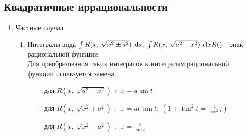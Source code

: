 \documentclass[a4paper,12pt]{bookest}
\theoremstyle{remark}
\newcommand\dx{\textbf{ d}x}
\begin{document}
\subsection{Квадратичные иррациональности}
\begin{enumerate}
	\item Частные случаи \begin{enumerate} 
	\item Интегралы вида $\int R(x,\>\sqrt{x^2\pm a^2})\dx,\>\int R(x,\>\sqrt{a^2-x^2})\dx\\ R()$ - знак рациональной функции. \\
		Для преобразования таких интегралов к интегралам рациональной функции испльзуется замена.\begin{itemize}
			\item [-] для $R(x,\>\sqrt{a^2-x^2})\>\>:\>\>x=a\sin t$ 
			\item [-] для $R(x,\>\sqrt{x^2+ a^2})\>\>:\>\>x=at\tan t;\>(1+\tan^2t=\frac{1}{\cos^2t})$
			\item [-] для $R(x,\>\sqrt{x^2- a^2})\>\>:\>\>x=\frac{a}{\sin t}$


\end{itemize}
\end{enumerate}
\end{enumerate}
\end{document}
